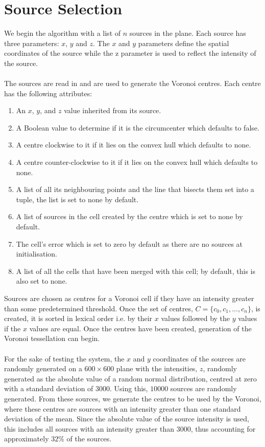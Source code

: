 \section{Source Selection}\label{sec:design:source}
We begin the algorithm with a list of $n$ sources in the plane. Each source has three parameters: $x$, $y$ and $z$. The $x$ and $y$ parameters define the spatial coordinates of the source while the z parameter is used to reflect the intensity of the source.
\\
\\
The sources are read in and are used to generate the Voronoi centres. Each centre has the following attributes:
\begin{enumerate}
\item An $x$, $y$, and $z$ value inherited from its source.
\item A Boolean value to determine if it is the circumcenter which defaults to false.
\item A centre clockwise to it if it lies on the convex hull which defaults to none.
\item A centre counter-clockwise to it if it lies on the convex hull which defaults to none.
\item A list of all its neighbouring points and the line that bisects them set into a tuple, the list is set to none by default.
\item A list of sources in the cell created by the centre which is set to none by default.
\item The cell's error which is set to zero by default as there are no sources at initialisation.
\item A list of all the cells that have been merged with this cell; by default, this is also set to none.
\end{enumerate} 
Sources are chosen as centres for a Voronoi cell if they have an intensity greater than some predetermined threshold. Once the set of centres, $C= \{c_0,c_1,...,c_n\}$, is created, it is sorted in lexical order i.e. by their $x$ values followed by the $y$ values if the $x$ values are equal. Once the centres have been created, generation of the Voronoi tessellation can begin.
\\
\\
For the sake of testing the system, the $x$ and $y$ coordinates of the sources are randomly generated on a $600 \times 600$ plane with the intensities, $z$, randomly generated as the absolute value of a random normal distribution, centred at zero with a standard deviation of $3000$. Using this, $10000$ sources are randomly generated. From these sources, we generate the centres to be used by the Voronoi, where these centres are sources with an intensity greater than one standard deviation of the mean. Since the absolute value of the source intensity is used, this includes all sources with an intensity greater than 3000, thus accounting for approximately $32\%$ of the sources.
